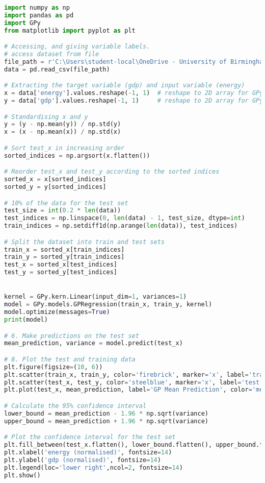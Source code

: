 \documentclass[12pt,a4paper]{article}
\begin{document}
\vspace{10pt}
\begin{lstlisting}[language=python, caption={Code of the Creation of Figures \ref{fig:Lin GPregression}}]
import numpy as np
import pandas as pd
import GPy
from matplotlib import pyplot as plt

# Accessing, and giving variable labels.
# access dataset from file
file_path = r'C:\Users\student-local\OneDrive - University of Birmingham\Dissertation\EuroEnergy.csv'
data = pd.read_csv(file_path)

# Extracting the target variable (gdp) and input variable (energy)
x = data['energy'].values.reshape(-1, 1)  # reshape to 2D array for GPy
y = data['gdp'].values.reshape(-1, 1)     # reshape to 2D array for GPy

# Standardising x and y
y = (y - np.mean(y)) / np.std(y)
x = (x - np.mean(x)) / np.std(x)

# Sort test_x in increasing order
sorted_indices = np.argsort(x.flatten())  

# Reorder test_x and test_y according to the sorted indices
sorted_x = x[sorted_indices]
sorted_y = y[sorted_indices]

# 10% of the data for the test set
test_size = int(0.2 * len(data))  
test_indices = np.linspace(0, len(data) - 1, test_size, dtype=int)
train_indices = np.setdiff1d(np.arange(len(data)), test_indices)

# Split the dataset into train and test sets
train_x = sorted_x[train_indices]  
train_y = sorted_y[train_indices]  
test_x = sorted_x[test_indices]    
test_y = sorted_y[test_indices]


kernel = GPy.kern.Linear(input_dim=1, variances=1)
model = GPy.models.GPRegression(train_x, train_y, kernel)
model.optimize(messages=True)
print(model)

# 6. Make predictions on the test set
mean_prediction, variance = model.predict(test_x)

# 8. Plot the test and training data
plt.figure(figsize=(10, 6))
plt.scatter(train_x, train_y, color='firebrick', marker='x', label='training set', s=50)
plt.scatter(test_x, test_y, color='steelblue', marker='x', label='test set', s=50)
plt.plot(test_x, mean_prediction, label='GP Mean Prediction', color='mediumpurple', linewidth=3)

# Calculate the 95% confidence interval
lower_bound = mean_prediction - 1.96 * np.sqrt(variance)
upper_bound = mean_prediction + 1.96 * np.sqrt(variance)

# Plot the confidence interval for the test set
plt.fill_between(test_x.flatten(), lower_bound.flatten(), upper_bound.flatten(), color='plum', alpha=0.3, label='Credible Interval (95%)')
plt.xlabel('energy (normalised)', fontsize=14)
plt.ylabel('gdp (normalised)', fontsize=14)
plt.legend(loc='lower right',ncol=2, fontsize=14)
plt.show()
\end{lstlisting}
\end{document}
